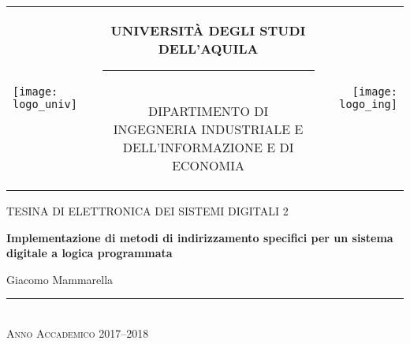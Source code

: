 \begin{titlepage}

\begin{center}
\normalsize

\begin{center}
\begin{tabular}[t]{@{} l @{} c @{} r @{}}
\parbox[c]{0.15\textwidth}{\raggedright \texttt{[image: logo\_univ]}}
&
\parbox[c]{0.7\textwidth}
{
\centering \bfseries
UNIVERSITÀ DEGLI STUDI DELL'AQUILA \\[-5pt]
\rule{0.65\textwidth}{1pt} \\
{\scshape DIPARTIMENTO DI \\ INGEGNERIA INDUSTRIALE E DELL'INFORMAZIONE E DI ECONOMIA }
}
&
\parbox[c]{0.15\textwidth}{\raggedleft \texttt{[image: logo\_ing]}}
\end{tabular}
\end{center}

\bigskip \bigskip



\bigskip \bigskip

{\small TESINA DI ELETTRONICA DEI SISTEMI DIGITALI 2\\

\vfil \vfil \vfil

{\bfseries \large
Implementazione di metodi di indirizzamento specifici per un sistema digitale a logica programmata\\
}

\vfil \vfil \vfil

Giacomo Mammarella

\vfil \vfil \vfil

\rule{\textwidth}{1pt}\\
{\scshape Anno Accademico 2017--2018}
}
\end{center}

\end{titlepage}

